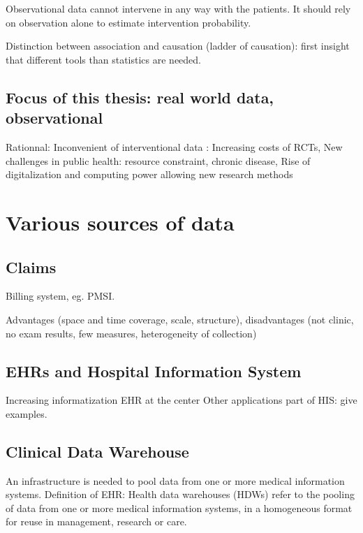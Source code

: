\documentclass{report}
\begin{document}
Observational data cannot intervene in any way with the patients. It should rely on observation alone to estimate intervention probability.

Distinction between association and causation (ladder of causation): first insight that different tools than statistics are needed.

\subsection{Focus of this thesis: real world data, observational}\label{subsec:intro:focus_data}

Rationnal:
Inconvenient of interventional data : Increasing costs of RCTs,
New challenges in public health: resource constraint, chronic disease,
Rise of digitalization and computing power allowing new research methods


\section{Various sources of data}\label{sec:intro:sources}

\subsection{Claims}\label{subsec:intro:claims}

Billing system, eg. PMSI.

Advantages (space and time coverage, scale, structure), disadvantages (not clinic, no exam results, few measures, heterogeneity of collection)

\subsection{EHRs and Hospital Information System}\label{subsec:intro:EHRs}

Increasing informatization
EHR at the center
Other applications part of HIS: give examples.

\subsection{Clinical Data Warehouse}\label{subsec:intro:cdw}
An infrastructure is needed to pool data from one or more medical information systems.
Definition of EHR: Health data warehouses (HDWs) refer to the pooling of data from one or more medical information systems, in a homogeneous format for reuse in management, research or care.
\end{document}
